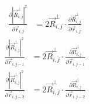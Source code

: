 \documentclass{article}
\renewcommand{\ij}{_{i,j}}
\newcommand{\ijj}{_{i,j-1}}
\newcommand{\ijjj}{_{i,j-2}}
\newcommand{\magn}[1]{\left\vert #1 \right\vert }
\renewcommand{\part}[2]{\frac{\partial #1 }{\partial #2}}
\newcommand{\partbig}[2]{\frac{\partial }{\partial #2}\left( #1 \right)}
\newcommand{\rij}{\vec{r} \ij}
\newcommand{\Rij}{\vec{R} \ij}
\newcommand{\rijj}{\vec{r} \ijj}
\newcommand{\rijjj}{\vec{r} \ijjj}
\begin{document}
\begin{align*}
  \part{
    \magn{\Rij^\perp}^2
  }{ \rij }
  &= 
  2 \Rij^\perp \cdot \part{\Rij^\perp}{\rij}
\end{align*}
\begin{align*}
  \part{
    \magn{\Rij^\perp}^2
  }{ \rijj }
  &= 
  2 \Rij^\perp \cdot \part{\Rij^\perp}{\rijj}
\end{align*}
\begin{align*}
  \part{
    \magn{\Rij^\perp}^2
  }{ \rijjj }
  &= 
  2 \Rij^\perp \cdot \part{\Rij^\perp}{\rijjj}
\end{align*}



\end{document}
